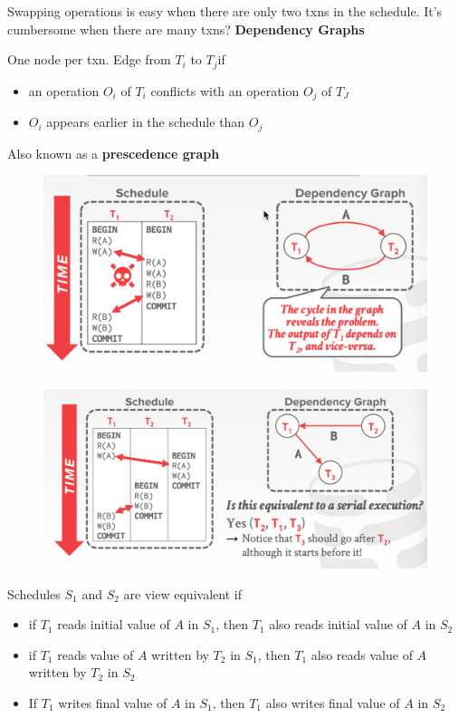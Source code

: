 \documentclass[11pt]{article}
\begin{document}
Swapping operations is easy when there are only two txns in the schedule. It's cumbersome when
there are many txns? \textbf{Dependency Graphs}

One node per txn. Edge from \(T_i\) to \(T_j\)if
\begin{itemize}
\item an operation \(O_i\) of \(T_i\) conflicts with an operation \(O_j\) of \(T_J\)
\item \(O_i\) appears earlier in the schedule than \(O_j\)
\end{itemize}
Also known as a \textbf{prescedence graph}

\begin{figure}[htbp]
\centering
\includegraphics[width=.8\textwidth]{../images/15445/54.png}
\label{}
\end{figure}

\begin{figure}[htbp]
\centering
\includegraphics[width=.8\textwidth]{../images/15445/55.png}
\label{}
\end{figure}

Schedules \(S_1\) and \(S_2\) are view equivalent if
\begin{itemize}
\item if \(T_1\) reads initial value of \(A\) in \(S_1\), then \(T_1\) also reads initial value
of \(A\) in \(S_2\)
\item if \(T_1\) reads value of \(A\) written by \(T_2\) in \(S_1\), then \(T_1\) also reads value
of \(A\) written by \(T_2\) in \(S_2\)
\item If \(T_1\) writes final value of \(A\) in \(S_1\), then \(T_1\) also writes final value of \(A\)
in \(S_2\)
\end{itemize}
\end{document}
